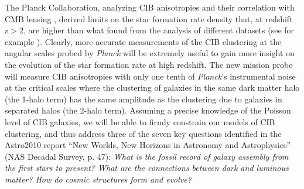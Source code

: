 The Planck Collaboration, analyzing CIB anisotropies and their
correlation with CMB lensing \citep{planck2014-XXX,planckXVIII},
derived limits on the star formation rate density that,
at redshift $\mathrm{z>2}$, are higher than what found from the analysis of
different datasets (see for example \cite{madau2014}).
Clearly, more accurate measurements of the CIB clustering at the
angular scales probed by {\it Planck} will be extremely useful to
gain more insight on the evolution of the star formation rate at
high redshift. The new mission probe will measure CIB anisotropies
with only one tenth of {\it Planck}'s instrumental noise at the critical
scales where the clustering of galaxies in the same dark matter
halo (the 1-halo term) has the same amplitude as the
clustering due to galaxies in separated halos
(the 2-halo term). Assuming a precise knowledge of the
Poisson level of CIB
galaxies, we will be able to firmly
constrain our models of CIB clustering,
and thus address three of the seven key questions
identified in the Astro2010 report
``New Worlds, New Horizons in Astronomy and Astrophysics''
(NAS Decadal Survey, p. 47):
{\it What is the fossil record of galaxy assembly                                                   
from the first stars to present? What are the connections                                           
between dark and luminous matter?
How do cosmic structures form and evolve?}

